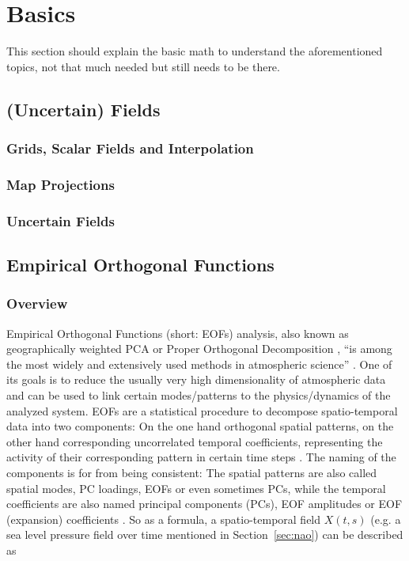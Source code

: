 
\chapter{Basics}
\label{ch:basics}

This section should explain the basic math to understand the aforementioned topics, not that much needed but still needs to be there.

\section{(Uncertain) Fields}
\label{sec:uncertainfields}

\subsection{Grids, Scalar Fields and Interpolation}

\subsection{Map Projections}

\subsection{Uncertain Fields}

\section{Empirical Orthogonal Functions}
\label{sec:eof}


\subsection{Overview}

Empirical Orthogonal Functions (short: EOFs) analysis, also known as geographically weighted PCA or Proper Orthogonal Decomposition \cite{vietinghoffdiss}, \enquote{is among the most widely and extensively used methods in atmospheric science} \cite{hannachi_empirical_2007}. 
One of its goals is to reduce the usually very high dimensionality of atmospheric data and can be used to link certain modes/patterns to the physics/dynamics of the analyzed system.  
EOFs are a statistical procedure to decompose spatio-temporal data into two components: On the one hand orthogonal spatial patterns, on the other hand corresponding uncorrelated temporal coefficients, representing the activity of their corresponding pattern in certain time steps \cite{hannachi_empirical_2007, vietinghoffdiss}. 
The naming of the components is for from being consistent: The spatial patterns are also called spatial modes, PC loadings, EOFs or even sometimes PCs, while the temporal coefficients are also named principal components (PCs), EOF amplitudes or EOF (expansion) coefficients \cite{hannachi_empirical_2007}. 
So as a formula, a spatio-temporal field $X(t, s)$ (e.g. a sea level pressure field over time mentioned in Section~\ref{sec:nao}) can be described as

